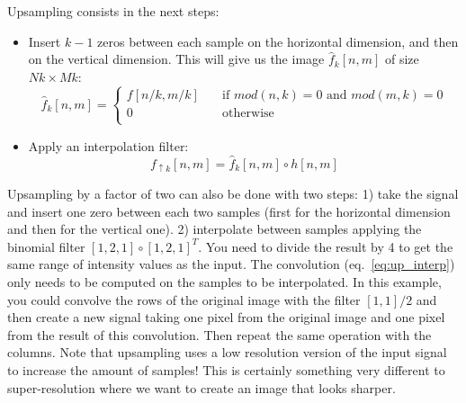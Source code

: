 Upsampling consists in the next steps:
\begin{itemize}
\item Insert $k-1$ zeros between each sample on the horizontal dimension, and then on the vertical dimension. This will give us the image $\widehat{f}_k \left[n,m\right]$ of size $Nk \times Mk$:
\begin{equation}
\widehat{f}_k \left[n,m\right] = 
 \begin{cases}
    f \left[n/k,m/k\right]     & \quad \text{if } mod(n,k)=0 \text{~and~} mod(m,k)=0\\
    0       & \quad \text{otherwise }\\
  \end{cases}
  \label{eq:upzeros}
\end{equation}
\item Apply an interpolation filter: 
\begin{equation}
f_{\uparrow k} \left[n,m\right] = \widehat{f}_k \left[n,m\right] \circ h \left[n,m\right]
\label{eq:up_interp}
\end{equation}
\end{itemize}
Upsampling by a factor of two can also be done with two steps: 1) take the signal and insert one zero between each two samples (first for the horizontal dimension and then for the vertical one). 2) interpolate between samples applying the binomial filter $\left[1,2,1\right] \circ \left[1,2,1\right]^T$. You need to divide the result by 4 to get the same range of intensity values as the input. The convolution (eq.~\ref{eq:up_interp}) only needs to be computed on the samples to be interpolated. In this example, you could convolve the rows of the original image with the filter $\left[1,1\right]/2$ and then create a new signal taking one pixel from the original image and one pixel from the result of this convolution. Then repeat the same operation with the columns. Note that upsampling uses a low resolution version of the input signal to increase the amount of samples! This is certainly something very different to super-resolution where we want to create an image that looks sharper. 


